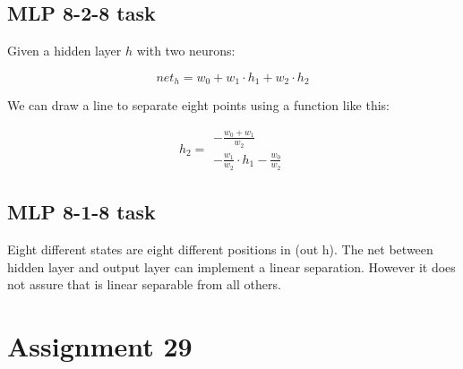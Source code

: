 \documentclass[12pt]{article}
\begin{document}
\subsection{MLP 8-2-8 task}

Given a hidden layer $h$ with two neurons:

$$ net_{h} = w_{0} + w_{1} \cdot h_{1} +  w_{2} \cdot h_{2} $$

We can draw a line to separate eight points using a function like this:

\begin{equation}
    h_{2} = \begin{array}{l}
                    - \frac{w_{0} + w_{1}}{w_{2}}\\
                    - \frac{w_{1}}{w_{2}} \cdot h_{1} - \frac{w_{0}}{w_{2}}
            \end{array}
\end{equation}

\bigskip
\bigskip

\subsection{MLP 8-1-8 task}

Eight different states are eight different positions in (out h). The net
between hidden layer and output layer can implement a linear separation.
However it does not assure that is linear separable from all others.

\section{Assignment 29}
\end{document}
